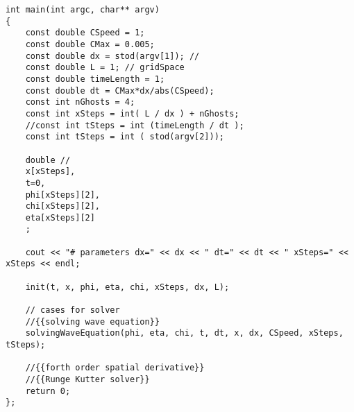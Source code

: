 \documentclass[10pt,fleqn,reqno,a4paper]{article}
\begin{document}
\begin{verbatim}
int main(int argc, char** argv)
{
    const double CSpeed = 1;
    const double CMax = 0.005;
    const double dx = stod(argv[1]); //
    const double L = 1; // gridSpace
    const double timeLength = 1;
    const double dt = CMax*dx/abs(CSpeed);
    const int nGhosts = 4;
    const int xSteps = int( L / dx ) + nGhosts;
    //const int tSteps = int (timeLength / dt );
    const int tSteps = int ( stod(argv[2]));

    double //
    x[xSteps],
    t=0,
    phi[xSteps][2],
    chi[xSteps][2],
    eta[xSteps][2]
    ;

    cout << "# parameters dx=" << dx << " dt=" << dt << " xSteps=" <<  xSteps << endl;

    init(t, x, phi, eta, chi, xSteps, dx, L);

    // cases for solver
    //{{solving wave equation}}
    solvingWaveEquation(phi, eta, chi, t, dt, x, dx, CSpeed, xSteps, tSteps);

    //{{forth order spatial derivative}}
    //{{Runge Kutter solver}}
	return 0;
};
\end{verbatim}
\end{document}
